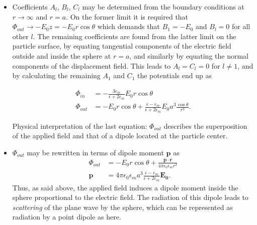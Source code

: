 \begin{itemize}
    \item Coefficients $A_l$, $B_l$, $C_l$ may be determined from the boundary conditions at $r \to \infty$ and $r=a$. On the former limit it is required that $\Phi_{out} \to -E_0z = -E_0r\cos\theta$ which demands that $B_1 = -E_0$ and $B_l=0$ for all other $l$. The remaining coefficients are found from the latter limit on the particle surface, by equating tangential components of the electric field outside and inside the sphere at $r=a$, and similarly by equating the normal components of the displacement field. This leads to $A_l = C_l = 0$ for $l \neq 1$, and by calculating the remaining $A_1$ and $C_1$ the potentials end up as
    
    \begin{align}
        \Phi_{in} &= -\frac{3\epsilon_m}{\epsilon+2\epsilon_m}E_0 r \cos\theta  \\
        \Phi_{out} &= -E_0 r \cos\theta + \frac{\epsilon-\epsilon_m}{\epsilon+2\epsilon_m} E_0 a^3 \frac{\cos\theta}{r^2}.
    \end{align}
    
    Physical interpretation of the last equation: $\Phi_{out}$ describes the superposition of the applied field and that of a dipole located at the particle center.
    
    \item $\Phi_{out}$ may be rewritten in terms of dipole moment $\mathbf{p}$ as
    \begin{align}
        \Phi_{out} &= -E_0 r \cos\theta + \frac{\mathbf{p}\cdot \mathbf{r}}{4\pi\epsilon_0\epsilon_mr^3}    \\
        \mathbf{p} &= 4\pi\epsilon_0\epsilon_m a^3 \frac{\epsilon-\epsilon_m}{\epsilon+2\epsilon_m} \mathbf{E_0}.
    \end{align}
    Thus, as said above, the applied field induces a dipole moment inside the sphere proportional to the electric field. The radiation of this dipole leads to \emph{scattering} of the plane wave by the sphere, which can be represented as radiation by a point dipole as here.
    

\end{itemize}
